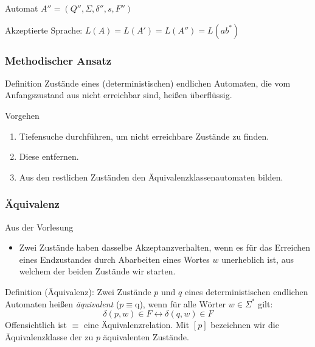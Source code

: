 \documentclass{beamer}
\begin{document}
{\begin{frame}
\begin{block}{Automat \(A'' = (Q'', \Sigma, \delta'', s, F'')\)}
\begin{figure}[H]
\begin{center}
\end{center}
\end{figure}
\end{block}
\begin{block}{}
 Akzeptierte Sprache: \(L(A) = L(A') = L(A'') = L(ab^*) \)
\end{block}
\end{frame}
\begin{frame}
 \frametitle{Methodischer Ansatz}
 \begin{block}{Definition}
  Zustände eines (deterministischen) endlichen Automaten, die vom Anfangszustand aus nicht erreichbar sind, heißen überflüssig.
 \end{block}
\begin{block}{Vorgehen}
 \begin{enumerate}
  \item Tiefensuche durchführen, um nicht erreichbare Zustände zu finden.
  \item Diese entfernen.
  \item Aus den restlichen Zuständen den Äquivalenzklassenautomaten bilden.
 \end{enumerate}
\end{block}
\end{frame}
\begin{frame}
 \frametitle{Äquivalenz}
 \vspace{-1cm}
 \begin{block}{Aus der Vorlesung}
  \begin{itemize}
   \item Zwei Zustände haben dasselbe Akzeptanzverhalten, wenn es für das Erreichen eines Endzustandes durch Abarbeiten eines Wortes $w$
   unerheblich ist, aus welchem der beiden Zustände wir starten.
  \end{itemize}
 \end{block}
 \begin{block}{Definition (Äquivalenz):}
  Zwei Zustände $p$ und $q$ eines deterministischen endlichen Automaten heißen \emph{äquivalent} ($p \equiv $q),
  wenn für alle Wörter $w\in\Sigma^*$ gilt:
  \[
   \delta(p, w)\in F \leftrightarrow \delta(q, w)\in F
  \]
  Offensichtlich ist $\equiv$ eine Äquivalenzrelation. Mit $[p]$ bezeichnen wir die Äquivalenzklasse der zu $p$ äquivalenten Zustände.
 \end{block}
\end{frame}
\begin{frame}

\end{frame}}
\end{document}
